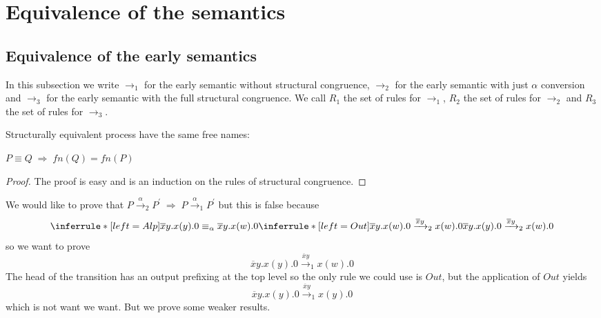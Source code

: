 \section{Equivalence of the semantics}
\subsection{Equivalence of the early semantics}
In this subsection we write $\rightarrow_{1}$ for the early semantic without structural congruence, $\rightarrow_{2}$ for the early semantic with just $\alpha$ conversion and $\rightarrow_{3}$ for the early semantic with the full structural congruence. We call $R_{1}$ the set of rules for $\rightarrow_{1}$, $R_{2}$ the set of rules for $\rightarrow_{2}$ and $R_{3}$ the set of rules for $\rightarrow_{3}$. 


\begin{lemma}
  Structurally equivalent process have the same free names:
  \begin{center}
    $P\equiv Q\; \Rightarrow\; fn(Q)= fn(P)$
  \end{center}
  \begin{proof}
    The proof is easy and is an induction on the rules of structural congruence.
  \end{proof}
\end{lemma}

We would like to prove that $P\xrightarrow{\alpha}_{2}P^{'}\; \Rightarrow\; P\xrightarrow{\alpha}_{1}P^{'}$ but this is false because
\[
  \inferrule* [left=Alp]{
      \overline{x}y.x(y).0 \equiv_{\alpha} \overline{x}y.x(w).0
    \\
      \inferrule* [left=Out]{
      }{
	\overline{x}y.x(w).0\xrightarrow{\overline{x}y}_{2}x(w).0
      }
  }{
    \overline{x}y.x(y).0\xrightarrow{\overline{x}y}_{2}x(w).0
  }
\]
so we want to prove 
\[
  \overline{x}y.x(y).0\xrightarrow{\overline{x}y}_{1}x(w).0
\] 
The head of the transition has an output prefixing at the top level so the only rule we could use is $Out$, but the application of $Out$ yields 
\[
  \overline{x}y.x(y).0\xrightarrow{\overline{x}y}_{1}x(y).0
\] 
which is not want we want. But we prove some weaker results.

